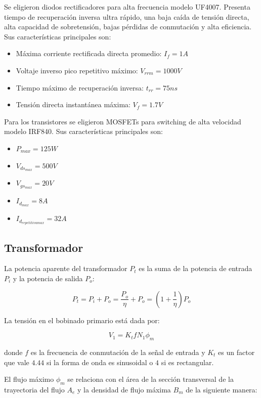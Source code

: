 Se eligieron diodos rectificadores para alta frecuencia modelo UF4007. 
Presenta tiempo de recuperación inversa ultra rápido, una baja caída de tensión directa, alta capacidad de sobretensión, bajas pérdidas de conmutación y alta eficiencia.
Sus características principales son: 

\begin{itemize}
    \item Máxima corriente rectificada directa promedio: $I_f=1A$
    \item Voltaje inverso pico repetitivo máximo: $V_{rrm}=1000V$
    \item Tiempo máximo de recuperación inversa: $t_{rr}=75ns$
    \item Tensión directa instantánea máxima: $V_f=1.7V$
\end{itemize}

Para los transistores se eligieron MOSFETs para switching de alta velocidad modelo IRF840. 
Sus características principales son: 

\begin{itemize}
    \item $P_{max}=125W$
    \item $V_{ds_{max}}=500V$
    \item $V_{gs_{max}}=20V$
    \item $I_{d_{max}}=8A$
    \item $I_{d_{repetitiva max}}=32A$
\end{itemize}

\subsection{Transformador}

La potencia aparente del transformador $P_{t}$ es la suma de la potencia de entrada $P_{i}$ y la potencia de salida $P_{o}$:

$$ P_{t}=P_{i}+P_{o}=\frac{P_{o}}{\eta}+P_{o}=\left(1+\frac{1}{\eta}\right)P_{o} $$

La tensión en el bobinado primario está dada por: 

$$ V_{1}=K_{t} f N_{1} \phi_{m} $$

donde $f$ es la frecuencia de conmutación de la señal de entrada y 
$K_t$ es un factor que vale $4.44$ si la forma de onda es sinusoidal o $4$ si es rectangular.

El flujo máximo $\phi_{m}$ se relaciona con el área de la sección transversal de la trayectoria del flujo $A_{e}$ y la densidad de flujo máxima $B_{m}$ de la siguiente manera:

